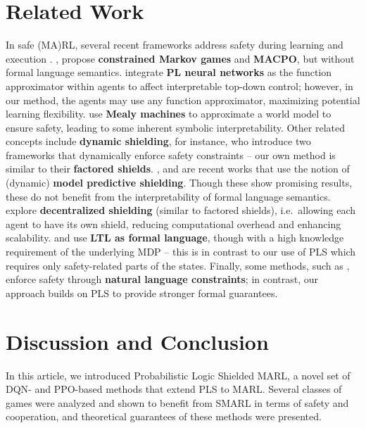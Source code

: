 \documentclass{ecai}
\theoremstyle{plain}
\theoremstyle{definition}
\theoremstyle{remark}
\begin{document}
\section{Related Work}

In safe (MA)RL, several recent frameworks address safety during learning and execution \citep{gu2024review}. \citet{gu2023safe}, propose \textbf{constrained Markov games} and \textbf{MACPO}, but without formal language semantics. \citet{subramanian2024neuro} integrate \textbf{PL neural networks} as the function approximator within agents to affect interpretable top-down control; however, in our method, the agents may use any function approximator, maximizing potential learning flexibility. \citet{waga2022dynamic} use \textbf{Mealy machines} to approximate a world model to ensure safety, leading to some inherent symbolic interpretability. Other related concepts include \textbf{dynamic shielding}, for instance, \citet{elsayed2021safe} who introduce two frameworks that dynamically enforce safety constraints -- our own method is similar to their \textbf{factored shields}. 
\citet{banerjee2024dynamic}, \citet{zhang2019mamps} and \citet{xiao2023model} are recent works that use the notion of (dynamic) \textbf{model predictive shielding}. Though these show promising results, these do not benefit from the interpretability of formal language semantics.
\citet{melcer2022shield} explore \textbf{decentralized shielding} (similar to factored shields), i.e.\ allowing each agent to have its own shield, reducing computational overhead and enhancing scalability. \citep{melcer2022shield} and \citep{elsayed2021safe} use \textbf{LTL as formal language}, though with a high knowledge requirement of the underlying MDP -- this is in contrast to our use of PLS which requires only safety-related parts of the states. Finally, some methods, such as \citet{wang2024safe}, enforce safety through \textbf{natural language constraints}; in contrast, our approach builds on PLS to provide stronger formal guarantees.

\section{Discussion and Conclusion}
In this article, we introduced Probabilistic Logic Shielded MARL, a novel set of DQN- and PPO-based methods that extend PLS to MARL. Several classes of games were analyzed and shown to benefit from SMARL in terms of safety and cooperation, and theoretical guarantees of these methods were presented.
\end{document}
